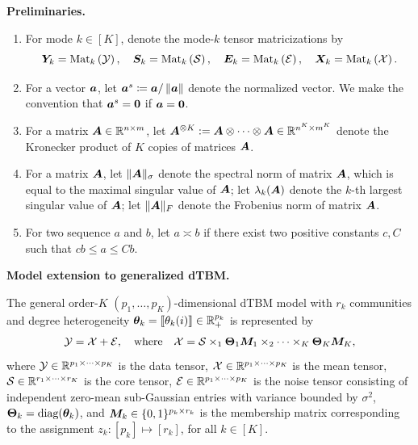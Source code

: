 \documentclass[lettersize,onecolumn,journal]{IEEEtran}
\theoremstyle{definition}
\theoremstyle{definition}
\newcommand{\of}[1]{\left(#1\right)}
\begin{document}
{\bf Preliminaries.}
\begin{enumerate}[wide]
    \item For mode $ k \in [K]$, denote the mode-$k$ tensor matricizations by
    \begin{equation}
        \mY_k = \mat_k \of{ \tY }, \quad \mS_k = \mat_k \of{\tS}, \quad \mE_k = \mat_k \of{ \tE}, \quad \mX_k = \mat_k \of{\tX}.
    \end{equation}
    \item For a vector $\bm{a}$, let $\bm{a}^{s} \coloneqq \bm{a}/\left\lVert\bm{a}\right\rVert$ denote the normalized vector. We make the convention that $\bm{a}^s = {\bf 0}$ if $\bm{a} = {\bf 0}$. 
    \item For a matrix $\bm A \in \mathbb{R}^{n \times m} $, let $\bm A^{\otimes K}:=\bm A\otimes \cdots \otimes \bm A\in \mathbb{R}^{n^K \times m^K}$ denote the Kronecker product of $K$ copies of matrices $\bm A $.
    \item For a matrix $\bm A$, let $\lVert\bm A\rVert_\sigma$ denote the spectral norm of matrix $\bm A$, which is equal to the maximal singular value of $\bm A$; let $\lambda_k(\bm A)$ denote the $k$-th largest singular value of $\bm A$; let $\lVert\bm A\rVert_F$ denote the Frobenius norm of matrix $\bm A$.
    \item For two sequence $a$ and $b$, let $a \asymp b$ if there exist two positive constants $c, C$ such that $cb \leq a\leq Cb$. 
\end{enumerate}


{\bf Model extension to generalized dTBM.} 
 
 The general order-$K$ $(p_1, \ldots, p_K)$-dimensional dTBM model with $r_k$ communities and degree heterogeneity $\boldsymbol{\theta}_k = \llbracket \theta_k(i) \rrbracket \in \mathbb{R}_+^{p_k}$ is represented by
\begin{equation}\label{eq:general_dtbm}
    \tY = \tX+ \tE,\quad \text{where}\quad \tX=\tS \times_1 \mTheta_1 \mM_1 \times_2 \cdots \times_K \mTheta_K \mM_K,
\end{equation}
where $\mathcal{Y} \in \mathbb{R}^{p_1 \times \cdots \times p_K}$ is the data tensor, $\mathcal{X}\in \mathbb{R}^{p_1\times \cdots \times p_K}$ is the mean tensor, $\mathcal{S} \in \mathbb{R}^{r_1 \times \cdots \times r_K}$ is the core tensor, $\mathcal{E} \in \mathbb{R}^{p_1 \times \cdots \times p_K}$ is the noise tensor consisting of independent zero-mean sub-Gaussian entries with variance bounded by $\sigma^2$, $\boldsymbol{\Theta}_k = \text{diag}(\boldsymbol{\theta}_k)$, and $\bm M_k\in \{0,1\}^{p_k \times r_k}$ is the membership matrix corresponding to the assignment $z_k: [p_k] \mapsto [r_k]$, for all $k \in [K]$. 
\end{document}
